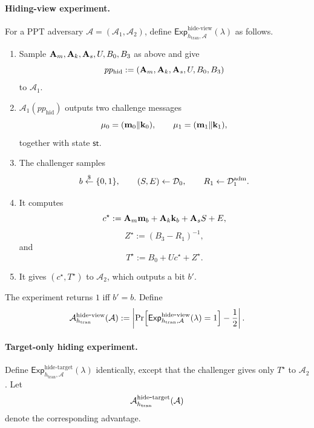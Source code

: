 \paragraph{Hiding-view experiment.}
For a PPT adversary \(\mathcal A=(\mathcal A_1,\mathcal A_2)\), define
\(\mathsf{Exp}^{\mathrm{hide\mbox{-}view}}_{h_{\mathrm{tran}},\mathcal A}(\lambda)\) as follows.
\begin{enumerate}[leftmargin=1.25em]
  \item Sample \(\mathbf{A}_m,\mathbf{A}_k,\mathbf{A}_s,U,B_0,B_3\) as above and give
  \[
  pp_{\mathrm{hid}} := (\mathbf{A}_m,\mathbf{A}_k,\mathbf{A}_s,U,B_0,B_3)
  \]
  to \(\mathcal A_1\).
  \item \(\mathcal A_1(pp_{\mathrm{hid}})\) outputs two challenge messages
  \[
  \mathbf{\mu}_0=(\mathbf{m}_0\Vert \mathbf{k}_0),\qquad \mathbf{\mu}_1=(\mathbf{m}_1\Vert \mathbf{k}_1),
  \]
  together with state \(\mathsf{st}\).
  \item The challenger samples
  \[
  b\overset{\$}{\leftarrow}\{0,1\},\qquad (S,E)\gets \mathcal D_0,\qquad R_1\gets \mathcal D_1^{\mathrm{adm}}.
  \]
  \item It computes
  \[
  c^\star := \mathbf{A}_m\mathbf{m}_b + \mathbf{A}_k\mathbf{k}_b + \mathbf{A}_s S + E,
  \]
  \[
  Z^\star := (B_3-R_1)^{-1},
  \]
  and
  \[
  T^\star := B_0 + Uc^\star + Z^\star.
  \]
  \item It gives \((c^\star,T^\star)\) to \(\mathcal A_2\), which outputs a bit \(b'\).
\end{enumerate}
The experiment returns \(1\) iff \(b'=b\). Define
\begin{equation}\label{eq:hide-view-adv}
\mathcal{A}^{\mathrm{hide\mbox{-}view}}_{h_{\mathrm{tran}}}(\mathcal A)
:=
\left|
\Pr\!\left[\mathsf{Exp}^{\mathrm{hide\mbox{-}view}}_{h_{\mathrm{tran}},\mathcal A}(\lambda)=1\right]
-\frac12
\right|.
\end{equation}

\paragraph{Target-only hiding experiment.}
Define \(\mathsf{Exp}^{\mathrm{hide\mbox{-}target}}_{h_{\mathrm{tran}},\mathcal A}(\lambda)\) identically,
except that the challenger gives only \(T^\star\) to \(\mathcal A_2\). Let
\begin{equation}\label{eq:hide-target-adv}
\mathcal{A}^{\mathrm{hide\mbox{-}target}}_{h_{\mathrm{tran}}}(\mathcal A)
\end{equation}
denote the corresponding advantage.

